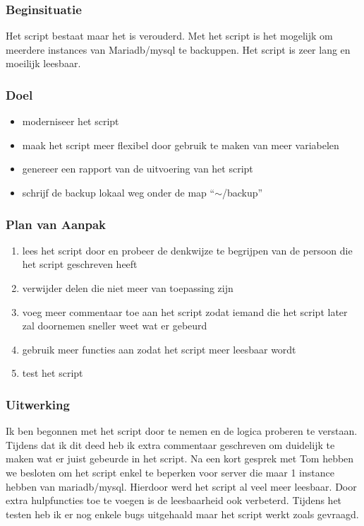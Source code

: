 \subsubsection{Beginsituatie}

Het script bestaat maar het is verouderd. Met het script is het mogelijk om meerdere instances van Mariadb/mysql te backuppen. Het script is zeer lang en moeilijk leesbaar.

\subsubsection{Doel}

\begin{itemize}
    \item moderniseer het script
    \item maak het script meer flexibel door gebruik te maken van meer variabelen
    \item genereer een rapport van de uitvoering van het script
    \item schrijf de backup lokaal weg onder de map ``$\sim$/backup''
\end{itemize}

\subsubsection{Plan van Aanpak}

\begin{enumerate}
    \item lees het script door en probeer de denkwijze te begrijpen van de persoon die het script geschreven heeft
    \item verwijder delen die niet meer van toepassing zijn
    \item voeg meer commentaar toe aan het script zodat iemand die het script later zal doornemen sneller weet wat er gebeurd
    \item gebruik meer functies aan zodat het script meer leesbaar wordt
    \item test het script
\end{enumerate}

\subsubsection{Uitwerking}

Ik ben begonnen met het script door te nemen en de logica proberen te verstaan. Tijdens dat ik dit deed heb ik extra commentaar geschreven om duidelijk te maken wat er juist gebeurde in het script. Na een kort gesprek met Tom hebben we besloten om het script enkel te beperken voor server die maar 1 instance hebben van mariadb/mysql. Hierdoor werd het script al veel meer leesbaar. Door extra hulpfuncties toe te voegen is de leesbaarheid ook verbeterd. Tijdens het testen heb ik er nog enkele bugs uitgehaald maar het script werkt zoals gevraagd.

